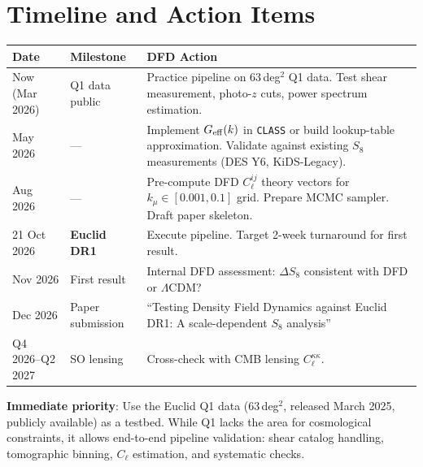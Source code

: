 \documentclass[11pt,a4paper]{article}
\newcommand{\LCDM}{$\Lambda$CDM}
\newcommand{\kmu}{k_\mu}
\newcommand{\Geff}{G_{\rm eff}}
\begin{document}
\section{Timeline and Action Items}
\label{sec:timeline}

\begin{center}
\begin{tabular}{llp{7cm}}
\toprule
\textbf{Date} & \textbf{Milestone} & \textbf{DFD Action} \\
\midrule
Now (Mar 2026) & Q1 data public & Practice pipeline on 63\,deg$^2$ Q1 data.
  Test shear measurement, photo-$z$ cuts, power spectrum estimation. \\
May 2026 & --- & Implement $\Geff(k)$ in \texttt{CLASS} or build
  lookup-table approximation. Validate against existing $S_8$ measurements
  (DES Y6, KiDS-Legacy). \\
Aug 2026 & --- & Pre-compute DFD $C_\ell^{ij}$ theory vectors for
  $\kmu \in [0.001, 0.1]$ grid. Prepare MCMC sampler. Draft paper
  skeleton. \\
21 Oct 2026 & \textbf{Euclid DR1} & Execute pipeline. Target 2-week
  turnaround for first result. \\
Nov 2026 & First result & Internal DFD assessment: $\Delta S_8$ consistent
  with DFD or \LCDM? \\
Dec 2026 & Paper submission & ``Testing Density Field Dynamics against
  Euclid DR1: A scale-dependent $S_8$ analysis'' \\
Q4 2026--Q2 2027 & SO lensing & Cross-check with CMB lensing
  $C_\ell^{\kappa\kappa}$. \\
\bottomrule
\end{tabular}
\end{center}

\textbf{Immediate priority}: Use the Euclid Q1 data (63\,deg$^2$,
released March 2025, publicly available) as a testbed. While Q1
lacks the area for cosmological constraints, it allows end-to-end
pipeline validation: shear catalog handling, tomographic binning,
$C_\ell$ estimation, and systematic checks.
\end{document}
